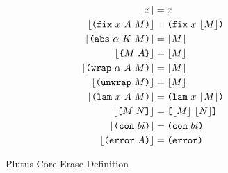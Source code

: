 \documentclass[../main.tex]{subfiles}
\begin{document}
\begin{figure*}
    \begin{align*}
        \erase{x} &= x\\
        \erase{\fix{x}{A}{M}} &= \fixE{x}{\erase{M}}\\
        \erase{\abs{\alpha}{K}{M}} &= \erase{M}\\
        \erase{\inst{M}{A}} &= \erase{M}\\
        \erase{\wrap{\alpha}{A}{M}} &= \erase{M}\\
        \erase{\unwrap{M}} &= \erase{M}\\
        \erase{\lam{x}{A}{M}} &= \lamE{x}{\erase{M}}\\
        \erase{\app{M}{N}} &= \appE{\erase{M}}{\erase{N}}\\
        \erase{\con{bi}} &= \conE{bi}\\
        \erase{\error{A}} &= \errorE{}\\
    \end{align*}

    \caption{Plutus Core Erase Definition}
    \label{fig:Plutus_core_erase_definition}
\end{figure*}      
\end{document}
